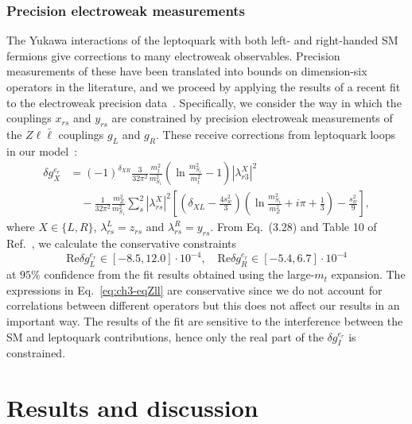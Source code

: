 \subsubsection{Precision electroweak measurements}

The Yukawa interactions of the leptoquark with both left- and right-handed SM
fermions give corrections to many electroweak observables. Precision
measurements of these have been translated into bounds on dimension-six
operators in the literature, and we proceed by applying the results of a recent
fit to the electroweak precision data~\cite{Ciuchini:2013pca}. Specifically, we
consider the way in which the couplings $x_{rs}$ and $y_{rs}$ are constrained by
precision electroweak measurements of the $Z \ell \bar{\ell}$ couplings $g_L$
and $g_R$. These receive corrections from leptoquark loops in our
model~\cite{Bauer:2015knc}:
\begin{equation} \label{eq:ch3-neccond}
  \begin{split}
  \delta g_X^{e_r} &= (-1)^{\delta_{XR}} \frac{3}{32 \pi^2} \frac{m_t^2}{m_{S_{1}}^2} \left( \ln \frac{m_{S_{1}}^2}{m_t^2} - 1 \right) |\lambda^X_{r 3}|^2 \\ &\quad - \frac{1}{32 \pi^2}\frac{m_Z^2}{m_{S_{1}}^2}\sum_{s}^2 |\lambda^X_{r s}|^2 \left[ \left( \delta_{XL} - \frac{4 s_w^2}{3} \right) \left( \ln\frac{m_{S_{1}}^2}{m_Z^2} + i\pi + \frac{1}{3} \right) - \frac{s_w^2}{9}\right],
  \end{split}
\end{equation}
where $X \in \{L,R\}$, $\lambda^L_{rs} = z_{rs}$ and $\lambda^R_{rs} = y_{rs}$.
From Eq.~(3.28) and Table 10 of Ref.~\cite{Ciuchini:2013pca}, we calculate the
conservative constraints
\begin{equation} \label{eq:ch3-eqZll}
  \text{Re}\delta g_L^{e_r} \in [-8.5, 12.0] \cdot 10^{-4}, \quad \text{Re}\delta g_R^{e_r} \in [-5.4, 6.7] \cdot 10^{-4}
\end{equation}
at $95\%$ confidence from the fit results obtained using the large-$m_t$
expansion. The expressions in Eq.~\eqref{eq:ch3-eqZll} are conservative since we do
not account for correlations between different operators but this does not
affect our results in an important way. The results of the fit are sensitive to
the interference between the SM and leptoquark contributions, hence only the
real part of the $\delta g_I^{e_r}$ is constrained.

\section{Results and discussion}
\label{sec:ch3-resultsanddiscussion}

